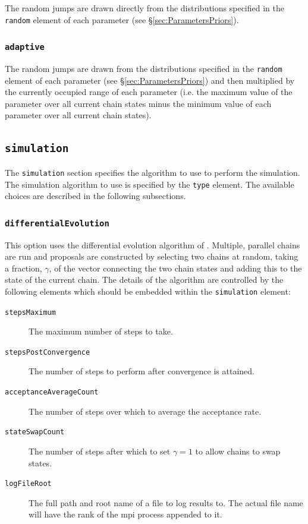 The random jumps are drawn directly from the distributions specified in the {\tt random} element of each parameter (see \S\ref{sec:ParametersPriors}).

\subsubsection{{\tt adaptive}}

The random jumps are drawn from the distributions specified in the {\tt random} element of each parameter (see \S\ref{sec:ParametersPriors}) and then multiplied by the currently occupied range of each parameter (i.e. the maximum value of the parameter over all current chain states minus the minimum value of each parameter over all current chain states).

\subsection{{\tt simulation}}

The {\tt simulation} section specifies the algorithm to use to perform the simulation. The simulation algorithm to use is specified by the {\tt type} element. The available choices are described in the following subsections.

\subsubsection{{\tt differentialEvolution}}

This option uses the differential evolution algorithm of \cite{terr_braak_markov_2006}. Multiple, parallel chains are run and proposals are constructed by selecting two chains at random, taking a fraction, $\gamma$, of the vector connecting the two chain states and adding this to the state of the current chain. The details of the algorithm are controlled by the following elements which should be embedded within the {\tt simulation} element:
\begin{description}
\item[{\tt stepsMaximum}] The maximum number of steps to take.
\item[{\tt stepsPostConvergence}] The number of steps to perform after convergence is attained.
\item[{\tt acceptanceAverageCount}] The number of steps over which to average the acceptance rate.
\item[{\tt stateSwapCount}] The number of steps after which to set $\gamma=1$ to allow chains to swap states.
\item[{\tt logFileRoot}] The full path and root name of a file to log results to. The actual file name will have the rank of the \gls{mpi} process appended to it.
\end{description}

